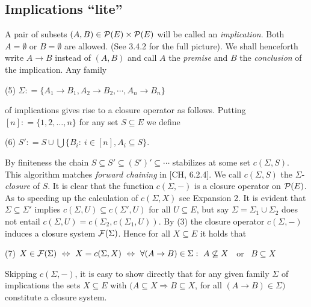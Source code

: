 \documentclass[11pt]{article}
\newcommand{\ra}{\rightarrow}
\newcommand{\Ra}{\Rightarrow}
\begin{document}
\subsection{Implications ``lite''}

A pair of subsets $(A, B) \in {\cal P}(E) \times {\cal P}(E)$ will be called an {\it implication}. Both $A = \emptyset$ or $B = \emptyset$ are allowed. (See 3.4.2 for the full picture). We shall henceforth write $A \ra B$ instead of $(A,B)$ and call $A$ the {\it premise} and $B$ the {\it conclusion} of the implication.  Any family

(5) \quad $\Sigma : = \{A_1 \ra B_1, A_2 \ra B_2, \cdots, A_n \ra B_n\}$

of implications gives rise to a closure operator as follows. Putting $[n] : = \{1, 2, \ldots, n\}$ for any set $S \subseteq E$ we define

(6) \quad $S': = S \cup \bigcup \{B_i: \ i \in [n], A_i \subseteq S \}$.

By finiteness the chain $S \subseteq S'\subseteq (S')'\subseteq \cdots$ stabilizes at some set $c(\Sigma, S)$. This algorithm matches {\it forward chaining} in [CH, 6.2.4]. We call $c(\Sigma, S)$ the $\Sigma$-{\it closure} of $S$. It is clear that the function $c(\Sigma, -)$ is a closure operator on ${\cal P}(E)$. As to speeding up the calculation of $c(\Sigma, X)$ see Expansion 2.
 It is evident that $\Sigma \subseteq \Sigma'$ implies $c(\Sigma, U) \subseteq c(\Sigma', U)$ for all $U \subseteq E$, but say $\Sigma = \Sigma_1 \cup \Sigma_2$ does not entail $c(\Sigma, U) = c(\Sigma_2, c(\Sigma_1, U))$.
 By (3) the closure operator $c(\Sigma, -)$ induces a closure system ${\cal F}(\Sigma)$. Hence for all $X \subseteq E$ it holds that
 
 (7) \quad $X \in {\cal F}(\Sigma) \ \Leftrightarrow \ X = c(\Sigma, X) \ \Leftrightarrow \ \forall (A \ra B) \in \Sigma: \ A \not\subseteq X$ \ or \ $B \subseteq X$

Skipping $c(\Sigma, -)$, it is easy to show directly that for any given family $\Sigma$ of implications the sets $X \subseteq E$ with $(A \subseteq X \Ra B \subseteq X$, for all $(A \ra B) \in \Sigma)$ constitute a closure system.
\end{document}
